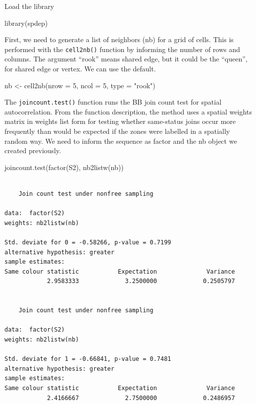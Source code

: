 \documentclass[
  letterpaper,
  DIV=11,
  numbers=noendperiod]{scrreprt}
\newenvironment{Shaded}{\begin{snugshade}}{\end{snugshade}}
\newcommand{\AttributeTok}[1]{\textcolor[rgb]{0.40,0.45,0.13}{#1}}
\newcommand{\DecValTok}[1]{\textcolor[rgb]{0.68,0.00,0.00}{#1}}
\newcommand{\FunctionTok}[1]{\textcolor[rgb]{0.28,0.35,0.67}{#1}}
\newcommand{\NormalTok}[1]{\textcolor[rgb]{0.00,0.23,0.31}{#1}}
\newcommand{\OtherTok}[1]{\textcolor[rgb]{0.00,0.23,0.31}{#1}}
\newcommand{\StringTok}[1]{\textcolor[rgb]{0.13,0.47,0.30}{#1}}
\begin{document}
Load the library

\begin{Shaded}
\begin{Highlighting}[]
\FunctionTok{library}\NormalTok{(spdep)}
\end{Highlighting}
\end{Shaded}

First, we need to generate a list of neighbors (nb) for a grid of cells.
This is performed with the \texttt{cell2nb()} function by informing the
number of rows and columns. The argument ``rook'' means shared edge, but
it could be the ``queen'', for shared edge or vertex. We can use the
default.

\begin{Shaded}
\begin{Highlighting}[]
\NormalTok{nb }\OtherTok{\textless{}{-}} \FunctionTok{cell2nb}\NormalTok{(}\AttributeTok{nrow =} \DecValTok{5}\NormalTok{,}
              \AttributeTok{ncol =} \DecValTok{5}\NormalTok{,}
              \AttributeTok{type =} \StringTok{"rook"}\NormalTok{)}
\end{Highlighting}
\end{Shaded}

The \texttt{joincount.test()} function runs the BB join count test for
spatial autocorrelation. From the function description, the method uses
a spatial weights matrix in weights list form for testing whether
same-status joins occur more frequently than would be expected if the
zones were labelled in a spatially random way. We need to inform the
sequence as factor and the nb object we created previously.

\begin{Shaded}
\begin{Highlighting}[]
\FunctionTok{joincount.test}\NormalTok{(}\FunctionTok{factor}\NormalTok{(S2), }
                \FunctionTok{nb2listw}\NormalTok{(nb))}
\end{Highlighting}
\end{Shaded}

\begin{verbatim}

    Join count test under nonfree sampling

data:  factor(S2) 
weights: nb2listw(nb) 

Std. deviate for 0 = -0.58266, p-value = 0.7199
alternative hypothesis: greater
sample estimates:
Same colour statistic           Expectation              Variance 
            2.9583333             3.2500000             0.2505797 


    Join count test under nonfree sampling

data:  factor(S2) 
weights: nb2listw(nb) 

Std. deviate for 1 = -0.66841, p-value = 0.7481
alternative hypothesis: greater
sample estimates:
Same colour statistic           Expectation              Variance 
            2.4166667             2.7500000             0.2486957 
\end{verbatim}
\end{document}
